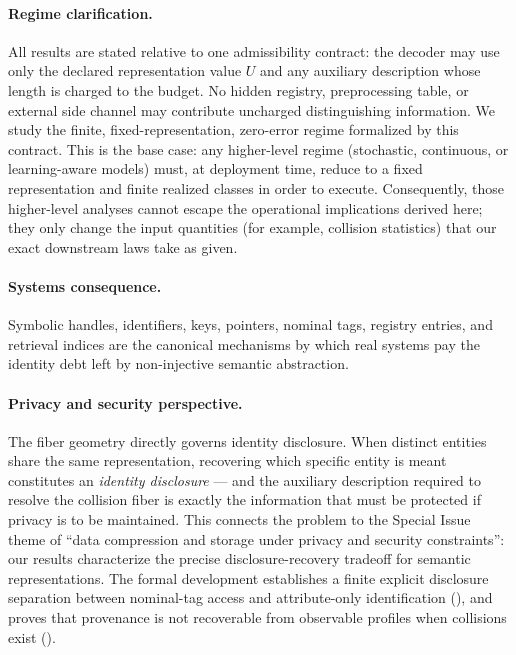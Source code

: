 \paragraph{Regime clarification.} All results are stated relative to one admissibility contract: the decoder may use only the declared representation value $U$ and any auxiliary description whose length is charged to the budget. No hidden registry, preprocessing table, or external side channel may contribute uncharged distinguishing information. We study the finite, fixed-representation, zero-error regime formalized by this contract. This is the base case: any higher-level regime (stochastic, continuous, or learning-aware models) must, at deployment time, reduce to a fixed representation and finite realized classes in order to execute. Consequently, those higher-level analyses cannot escape the operational implications derived here; they only change the input quantities (for example, collision statistics) that our exact downstream laws take as given.

\paragraph{Systems consequence.} Symbolic handles, identifiers, keys, pointers, nominal tags, registry entries, and retrieval indices are the canonical mechanisms by which real systems pay the identity debt left by non-injective semantic abstraction.

\paragraph{Privacy and security perspective.} The fiber geometry directly governs identity disclosure. When distinct entities share the same representation, recovering which specific entity is meant constitutes an \emph{identity disclosure} — and the auxiliary description required to resolve the collision fiber is exactly the information that must be protected if privacy is to be maintained. This connects the problem to the Special Issue theme of ``data compression and storage under privacy and security constraints'': our results characterize the precise disclosure-recovery tradeoff for semantic representations. The formal development establishes a finite explicit disclosure separation between nominal-tag access and attribute-only identification (), and proves that provenance is not recoverable from observable profiles when collisions exist ().

